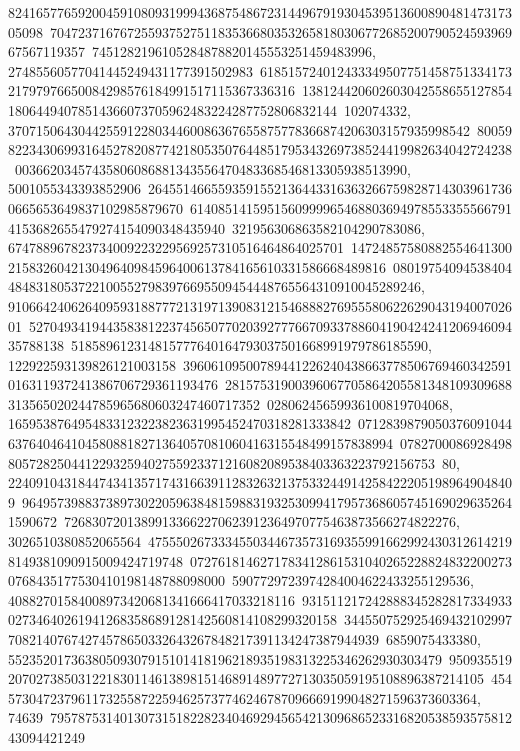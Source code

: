 {{{82416577659200459108093199943687548672314496791930453951360089048147317305098\
70472371676725593752751183536680353265818030677268520079052459396967567119357\
7451282196105284878820145553251459483996, 27485560577041445249431177391502983\
61851572401243334950775145875133417321797976650084298576184991517115367336316\
13812442060260304255865512785418064494078514366073705962483224287752806832144\
102074332, 370715064304425591228034460086367655875778366874206303157935998542\
80059822343069931645278208774218053507644851795343269738524419982634042724238\
00366203457435806086881343556470483368546813305938513990, 5001055343393852906\
26455146655935915521364433163632667598287143039617360665653649837102985879670\
61408514159515609999654688036949785533555667914153682655479274154090348435940\
321956306863582104290783086, 674788967823734009223229569257310516464864025701\
14724857580882554641300215832604213049640984596400613784165610331586668489816\
0801975409453840448483180537221005527983976695509454448765564310910045289246, 
   91066424062640959318877721319713908312154688827695558062262904319400702601\
52704934194435838122374565077020392777667093378860419042424120694609435788138\
518589612314815777640164793037501668991979786185590, 122922593139826121003158\
39606109500789441226240438663778506769460342591016311937241386706729361193476\
28157531900396067705864205581348109309688313565020244785965680603247460717352\
02806245659936100819704068, 1659538764954833123223823631995452470318281333842\
07128398790503760910446376404641045808818271364057081060416315548499157838994\
07827000869284988057282504412293259402755923371216082089538403363223792156753\
80, 2240910431844743413571743166391128326321375332449142584222051989649048409\
96495739883738973022059638481598831932530994179573686057451690296352641590672\
72683072013899133662270623912364970775463873566274822276, 3026510380852065564\
47555026733345503446735731693559916629924303126142198149381090915009424719748\
07276181462717834128615310402652288248322002730768435177530410198148788098000\
5907729723974284004622433255129536, 40882701584008973420681341666417033218116\
93151121724288834528281733493302734640261941268358689128142560814108299320158\
34455075292546943210299770821407674274578650332643267848217391134247387944939\
6859075433380, 55235201736380509307915101418196218935198313225346262930303479\
95093551920702738503122183011461389815146891489772713035059195108896387214105\
4545730472379611732558722594625737746246787096669199048271596373603364, 74639\
79578753140130731518228234046929456542130968652331682053859357581243094421249\
}}}
